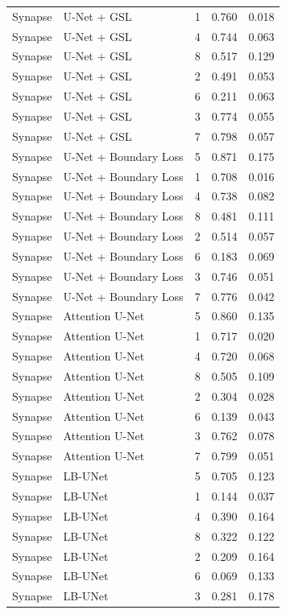 \begin{longtable}{lllll}
Synapse & U-Net + GSL & 1 & 0.760 & 0.018 \\
Synapse & U-Net + GSL & 4 & 0.744 & 0.063 \\
Synapse & U-Net + GSL & 8 & 0.517 & 0.129 \\
Synapse & U-Net + GSL & 2 & 0.491 & 0.053 \\
Synapse & U-Net + GSL & 6 & 0.211 & 0.063 \\
Synapse & U-Net + GSL & 3 & 0.774 & 0.055 \\
Synapse & U-Net + GSL & 7 & 0.798 & 0.057 \\
Synapse & U-Net + Boundary Loss & 5 & 0.871 & 0.175 \\
Synapse & U-Net + Boundary Loss & 1 & 0.708 & 0.016 \\
Synapse & U-Net + Boundary Loss & 4 & 0.738 & 0.082 \\
Synapse & U-Net + Boundary Loss & 8 & 0.481 & 0.111 \\
Synapse & U-Net + Boundary Loss & 2 & 0.514 & 0.057 \\
Synapse & U-Net + Boundary Loss & 6 & 0.183 & 0.069 \\
Synapse & U-Net + Boundary Loss & 3 & 0.746 & 0.051 \\
Synapse & U-Net + Boundary Loss & 7 & 0.776 & 0.042 \\
Synapse & Attention U-Net & 5 & 0.860 & 0.135 \\
Synapse & Attention U-Net & 1 & 0.717 & 0.020 \\
Synapse & Attention U-Net & 4 & 0.720 & 0.068 \\
Synapse & Attention U-Net & 8 & 0.505 & 0.109 \\
Synapse & Attention U-Net & 2 & 0.304 & 0.028 \\
Synapse & Attention U-Net & 6 & 0.139 & 0.043 \\
Synapse & Attention U-Net & 3 & 0.762 & 0.078 \\
Synapse & Attention U-Net & 7 & 0.799 & 0.051 \\
Synapse & LB-UNet & 5 & 0.705 & 0.123 \\
Synapse & LB-UNet & 1 & 0.144 & 0.037 \\
Synapse & LB-UNet & 4 & 0.390 & 0.164 \\
Synapse & LB-UNet & 8 & 0.322 & 0.122 \\
Synapse & LB-UNet & 2 & 0.209 & 0.164 \\
Synapse & LB-UNet & 6 & 0.069 & 0.133 \\
Synapse & LB-UNet & 3 & 0.281 & 0.178 \\

\end{longtable}
